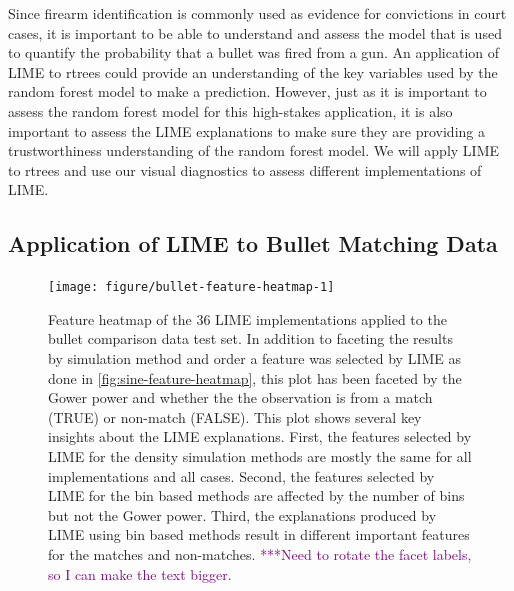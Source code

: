 \documentclass[AMS,STIX2COL]{WileyNJD-v2}\usepackage[]{graphicx}\usepackage[]{color}
\newenvironment{knitrout}{}{} %
\newcommand{\kgc}[1]{\textcolor{purple}{#1}}
\begin{document}
{Since firearm identification is commonly used as evidence for convictions in court cases, it is important to be able to understand and assess the model that is used to quantify the probability that a bullet was fired from a gun. An application of LIME to rtrees could provide an understanding of the key variables used by the random forest model to make a prediction. However, just as it is important to assess the random forest model for this high-stakes application, it is also important to assess the LIME explanations to make sure they are providing a trustworthiness understanding of the random forest model. We will apply LIME to rtrees and use our visual diagnostics to assess different implementations of LIME.

\subsection{Application of LIME to Bullet Matching Data}







\begin{figure}[!th]
\begin{knitrout}
\color{fgcolor}
\texttt{[image: figure/bullet-feature-heatmap-1]} 

\end{knitrout}
\caption{Feature heatmap of the 36 LIME implementations applied to the bullet comparison data test set. In addition to faceting the results by simulation method and order a feature was selected by LIME as done in \autoref{fig:sine-feature-heatmap}, this plot has been faceted by the Gower power and whether the the observation is from a match (TRUE) or non-match (FALSE). This plot shows several key insights about the LIME explanations. First, the features selected by LIME for the density simulation methods are mostly the same for all implementations and all cases. Second, the features selected by LIME for the bin based methods are affected by the number of bins but not the Gower power. Third, the explanations produced by LIME using bin based methods result in different important features for the matches and non-matches. \kgc{***Need to rotate the facet labels, so I can make the text bigger.}}
\label{fig:bullet-feature-heatmap}
\end{figure}

}
\end{document}
